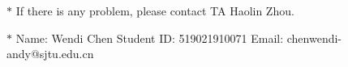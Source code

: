 \documentclass[12pt,a4paper]{article}
\theoremstyle{definition}
\begin{document}
	\noindent
	
	\noindent{}
	\begin{center}
		\footnotesize{\color{red}$*$ If there is any problem, please contact TA Haolin Zhou.}
		
		\footnotesize{\color{blue}$*$ Name: Wendi Chen  \quad Student ID: 519021910071 \quad Email: chenwendi-andy@sjtu.edu.cn}
		
	\end{center}
	
\end{document}
